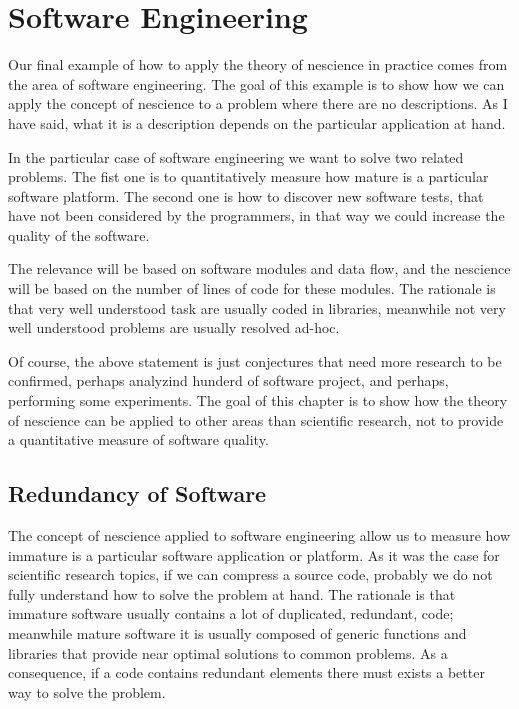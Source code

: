 %
%


\chapter{Software Engineering}
\label{chap:Software-Engineering}



Our final example of how to apply the theory of nescience in practice comes from the area of software engineering. The goal of this example is to show how we can apply the concept of nescience to a problem where there are no descriptions. As I have said, what it is a description depends on the particular application at hand.

In the particular case of software engineering we want to solve two related problems. The fist one is to quantitatively measure how mature is a particular software platform. The second one is how to discover new software tests, that have not been considered by the programmers, in that way we could increase the quality of the software.

The relevance will be based on software modules and data flow, and the nescience will be based on the number of lines of code for these modules. The rationale is that very well understood task are usually coded in libraries, meanwhile not very well understood problems are usually resolved ad-hoc.

Of course, the above statement is just conjectures that need more research to be confirmed, perhaps analyzind hunderd of software project, and perhaps, performing some experiments. The goal of this chapter is to show how the theory of nescience can be applied to other areas than scientific research, not to provide a quantitative measure of software quality.

\section{Redundancy of Software}

The concept of nescience applied to software engineering allow us to measure how immature is a particular software application or platform. As it was the case for scientific research topics, if we can compress a source code, probably we do not fully understand how to solve the problem at hand. The rationale is that immature software usually contains a lot of duplicated, redundant, code; meanwhile mature software it is usually composed of generic functions and libraries that provide near optimal solutions to common problems. As a consequence, if a code contains redundant elements there must exists a better way to solve the problem.


